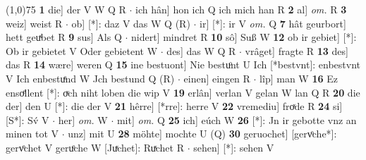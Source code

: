 \documentclass[8pt,a4paper,notitlepage]{article}
\begin{document}
\begin{table}[ht]
\begin{minipage}[t]{0.5\linewidth}
\line(1,0){75} \newline
\textbf{1} die] der V W Q R  $\cdot$ ich hân] hon ich Q ich mich han R \textbf{2} al] \textit{om.} R \textbf{3} weiz] weist R  $\cdot$ ob] [*]: daz V das W Q (R)  $\cdot$ ir] [*]: ir V \textit{om.} Q \textbf{7} hât geurbort] hett geuͯbet R \textbf{9} sus] Als Q  $\cdot$ nidert] mindret R \textbf{10} sô] Suß W \textbf{12} ob ir gebiet] [*]: Ob ir gebietet V Oder gebietent W  $\cdot$ des] das W Q R  $\cdot$ vrâget] fragte R \textbf{13} des] das R \textbf{14} wære] weren Q \textbf{15} ine bestuont] Nie bestuͦnt U Ich [*bestvnt]: enbestvnt V Ich enbestuͤnd W Jch bestund Q (R)  $\cdot$ einen] eingen R  $\cdot$ lîp] man W \textbf{16} Ez ensoͤllent [*]: oͮch niht loben die wip V \textbf{19} erlân] verlan V gelan W lan Q R \textbf{20} die der] den U [*]: die der V \textbf{21} hêrre] [*rre]: herre V \textbf{22} vremediu] froͯde R \textbf{24} si] [S*]: Sv́ V  $\cdot$ her] \textit{om.} W  $\cdot$ mit] \textit{om.} Q \textbf{25} ich] eúch W \textbf{26} [*]: Jn ir gebotte vnz an minen tot V  $\cdot$ unz] mit U \textbf{28} möhte] mochte U (Q) \textbf{30} geruochet] [gervͦche*]: gervͦchet V geruͦche W [Juͯchet]: Ruͯchet R  $\cdot$ sehen] [*]: sehen V \newline
\end{minipage}
\end{table}
\end{document}
